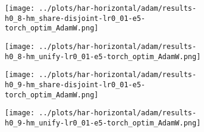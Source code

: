 \begin{figure}[htbp]  %
    \centering
    \begin{subfigure}[b]{0.47\textwidth}
        \centering
        \texttt{[image: ../plots/har-horizontal/adam/results-h0\_8-hm\_share-disjoint-lr0\_01-e5-torch\_optim\_AdamW.png]}
    \end{subfigure}
    \hfill
    \begin{subfigure}[b]{0.47\textwidth}
        \centering
        \texttt{[image: ../plots/har-horizontal/adam/results-h0\_8-hm\_unify-lr0\_01-e5-torch\_optim\_AdamW.png]}
    \end{subfigure}
\end{figure}
\begin{figure}[htbp]  %
    \centering
    \begin{subfigure}[b]{0.47\textwidth}
        \centering
        \texttt{[image: ../plots/har-horizontal/adam/results-h0\_9-hm\_share-disjoint-lr0\_01-e5-torch\_optim\_AdamW.png]}
    \end{subfigure}
    \hfill
    \begin{subfigure}[b]{0.47\textwidth}
        \centering
        \texttt{[image: ../plots/har-horizontal/adam/results-h0\_9-hm\_unify-lr0\_01-e5-torch\_optim\_AdamW.png]}
    \end{subfigure}
\end{figure}

